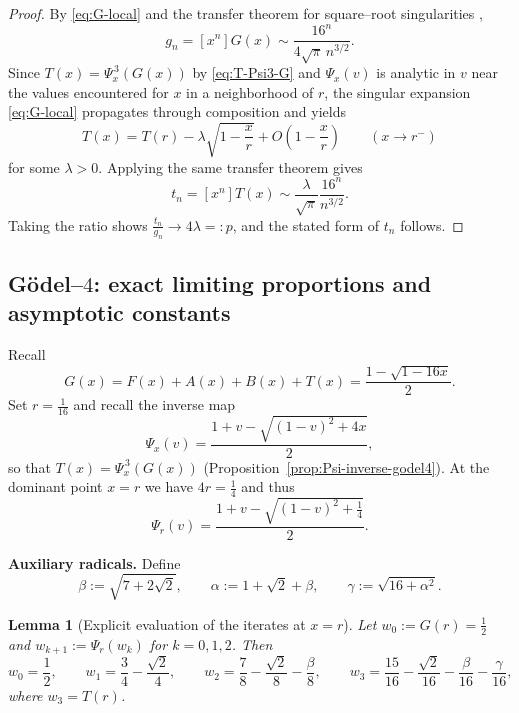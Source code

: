\documentclass[11pt]{article}
\newtheorem{lemma}{Lemma}
\begin{document}
\begin{proof}
By \eqref{eq:G-local} and the transfer theorem for square--root singularities
\cite[Ch.~VI]{FlajoletSedgewick2009},
\[
g_n=[x^n]G(x)\sim \frac{16^n}{4\sqrt{\pi}\,n^{3/2}}.
\]
Since \(T(x)=\Psi_x^{\,3}(G(x))\) by \eqref{eq:T-Psi3-G} and \(\Psi_x(v)\) is analytic in \(v\)
near the values encountered for \(x\) in a neighborhood of \(r\), the singular expansion
\eqref{eq:G-local} propagates through composition and yields
\[
T(x)=T(r)-\lambda \sqrt{1-\frac{x}{r}}+O\!\left(1-\frac{x}{r}\right)\qquad (x\to r^-)
\]
for some \(\lambda>0\). Applying the same transfer theorem gives
\[
t_n=[x^n]T(x)\sim \frac{\lambda}{\sqrt{\pi}}\frac{16^n}{n^{3/2}}.
\]
Taking the ratio shows \(\frac{t_n}{g_n}\to 4\lambda=:p\), and the stated form of \(t_n\)
follows.
\end{proof}

\subsection{Gödel--$4$: exact limiting proportions and asymptotic constants}

Recall
\[
G(x)=F(x)+A(x)+B(x)+T(x)=\frac{1-\sqrt{1-16x}}{2}.
\]
Set \(r=\frac1{16}\) and recall the inverse map
\[
\Psi_x(v)=\frac{1+v-\sqrt{(1-v)^2+4x}}{2},
\]
so that \(T(x)=\Psi_x^{\,3}(G(x))\) (Proposition~\ref{prop:Psi-inverse-godel4}).  At the
dominant point \(x=r\) we have \(4r=\frac14\) and thus
\begin{equation}\label{eq:Psi-at-r}
\Psi_r(v)=\frac{1+v-\sqrt{(1-v)^2+\frac14}}{2}.
\end{equation}

\medskip
\noindent\textbf{Auxiliary radicals.}
Define
\[
\beta:=\sqrt{7+2\sqrt2},\qquad
\alpha:=1+\sqrt2+\beta,\qquad
\gamma:=\sqrt{16+\alpha^2}.
\]

\begin{lemma}[Explicit evaluation of the iterates at \(x=r\)]\label{lem:iterates-at-r}
Let \(w_0:=G(r)=\frac12\) and \(w_{k+1}:=\Psi_r(w_k)\) for \(k=0,1,2\). Then
\[
w_0=\frac12,\qquad
w_1=\frac34-\frac{\sqrt2}{4},\qquad
w_2=\frac78-\frac{\sqrt2}{8}-\frac{\beta}{8},\qquad
w_3=\frac{15}{16}-\frac{\sqrt2}{16}-\frac{\beta}{16}-\frac{\gamma}{16},
\]
where \(w_3=T(r)\).
\end{lemma}
\end{document}

